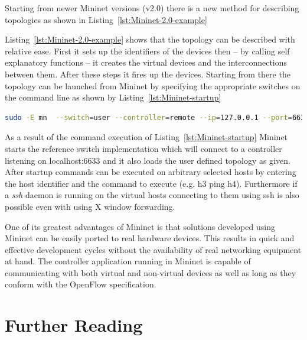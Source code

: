 \documentclass[a4paper]{article}
\begin{document}
Starting from newer Mininet versions (v2.0) there is a new method for describing topologies as shown in
Listing~\ref{lst:Mininet-2.0-example}



Listing~\ref{lst:Mininet-2.0-example} shows that the topology can be described with relative ease. First it sets up the
identifiers of the devices then -- by calling self explanatory functions -- it creates the virtual devices and the
interconnections between them. After these steps it fires up the devices. Starting from there the topology can be
launched from Mininet by specifying the appropriate switches on the command line as shown by
Listing~\ref{lst:Mininet-startup}

\begin{lstlisting}[language=bash,frame=single,breaklines,caption={Mininet startup command},label=Mininet-startup]
sudo -E mn  --switch=user --controller=remote --ip=127.0.0.1 --port=6633 --custom /home/openflow/mininet/custom/topo-test2.py --topo test
\end{lstlisting}

As a result of the command execution of Listing~\ref{lst:Mininet-startup} Mininet starts the reference switch
implementation which will connect to a controller listening on localhost:6633 and it also loads the user defined
topology as given. After startup  commands can be executed on arbitrary selected hosts by entering the host identifier
and the command to execute (e.g. h3 ping h4). Furthermore if a \emph{ssh} daemon is running on the virtual hosts
connecting to them using ssh is also possible even with using X window forwarding.

One of its greatest advantages of Mininet is that solutions developed using Mininet can be easily ported to real
hardware devices. This results in quick and effective development cycles without the availability of real networking
equipment at hand. The controller application running in Mininet is capable of communicating with both virtual and
non-virtual devices as well as long as they conform with the OpenFlow specification.

\section{Further Reading}
\end{document}
